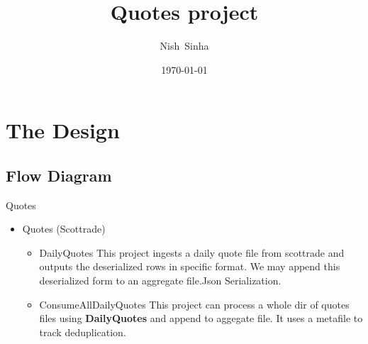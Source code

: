 \documentclass{beamer}
\title[Anomaly Detection System Overview]
{%
Quotes project
%
}
\author[Sinha N]
{
  Nish~Sinha\inst{1} \and
}
\institute[Xad]
{
  \inst{1}%
  Nsinha Inc.,  CA, USA
  \and
  \vskip-2mm
}
\date[\today]
{\today}
\begin{document}
\begin{frame}
  \titlepage
\end{frame}



\section{The Design}

\subsection{Flow Diagram }

\begin{frame}{Quotes}
    \begin{itemize}
	\item Quotes (Scottrade) 
    		\begin{itemize}
			\item DailyQuotes
				This project ingests a daily quote file from scottrade and outputs the deserialized rows in specific format. We may append this deserialized form to an aggregate file.Json Serialization.
			\item ConsumeAllDailyQuotes
				This project can process a whole dir of quotes files using \textbf{DailyQuotes} and append to aggegate file. It uses a metafile to track deduplication.
    		\end{itemize}
	    \end{itemize}
\end{frame}
\end{document}
